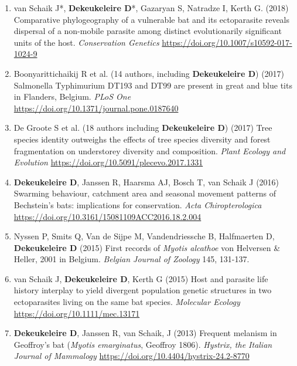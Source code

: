 \documentclass[10pt, twoside]{book} %
\begin{document}
\begin{enumerate}
		 \item van Schaik J*, \textbf{Dekeukeleire D}*, Gazaryan S, Natradze I, Kerth G. (2018) Comparative phylogeography of a vulnerable bat and its ectoparasite reveals dispersal of a non-mobile parasite among distinct evolutionarily significant units of the host. \textit{Conservation Genetics} \url{https://doi.org/10.1007/s10592-017-1024-9}
		 
		\item Boonyarittichaikij R et al. (14 authors, including \textbf{Dekeukeleire D}) (2017) Salmonella Typhimurium DT193 and DT99 are present in great and blue tits in Flanders, Belgium. \textit{PLoS One} \url{https://doi.org/10.1371/journal.pone.0187640}
		
		\item De Groote S et al. (18 authors including \textbf{Dekeukeleire D}) (2017) Tree species identity outweighs the effects of tree species diversity and forest fragmentation on understorey diversity and composition. \textit{Plant Ecology and Evolution} \url{https://doi.org/10.5091/plecevo.2017.1331}
		
		\item \textbf{Dekeukeleire D}, Janssen R, Haarsma AJ, Bosch T, van Schaik J (2016) Swarming behaviour, catchment area and seasonal movement patterns of Bechstein's bats: implications for conservation. \textit{Acta Chiropterologica}\\ \url{https://doi.org/10.3161/15081109ACC2016.18.2.004}
		
		\item Nyssen P, Smits Q, Van de Sijpe M, Vandendriessche B, Halfmaerten D, \textbf{Dekeukeleire D} (2015) First records of \textit{Myotis alcathoe} von Helversen \& Heller, 2001 in Belgium. \textit{Belgian Journal of Zoology} 145, 131-137.
		
		\item van Schaik J, \textbf{Dekeukeleire D}, Kerth G (2015) Host and parasite life history interplay to yield divergent population genetic structures in two ectoparasites living on the same bat species. \textit{Molecular Ecology} \url{https://doi.org/10.1111/mec.13171}
		
		\item \textbf{Dekeukeleire D}, Janssen R, van Schaik, J (2013) Frequent melanism in Geoffroy's bat (\textit{Myotis emarginatus}, Geoffroy 1806). \textit{Hystrix, the Italian Journal of Mammalogy} \url{https://doi.org/10.4404/hystrix-24.2-8770}
		
	\end{enumerate}
\end{document}
